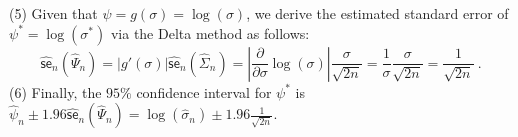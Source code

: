 {\begin{example}
\[\]
(5) Given that $\psi=g(\sigma)=\log(\sigma)$, we derive the estimated standard error of $\psi^*=\log(\sigma^*)$ via the Delta method as follows:
\[
\widehat{\mathsf{se}}_n(\widehat{\Psi}_n) = |g'(\sigma)| \widehat{\mathsf{se}}_n(\widehat{\Sigma}_n) = \left| \frac{\partial}{\partial \sigma} \log(\sigma) \right|  \frac{\sigma}{\sqrt{2 n}} 
= \frac{1}{\sigma} \frac{\sigma}{\sqrt{2 n}} = \frac{1}{\sqrt{2 n}} \ .
\]
(6) Finally, the $95\%$ confidence interval for $\psi^*$ is $\widehat{\psi}_n \pm 1.96 \widehat{\mathsf{se}}_n(\widehat{\Psi}_n) = \log(\widehat{\sigma}_n) \pm 1.96 \frac{1}{\sqrt{2 n}} $.
\end{example}









\clearpage
}
